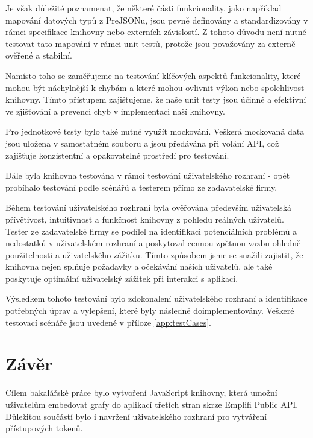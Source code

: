 \documentclass[czech, bc, kiv, he, iso690numb]{fasthesis}
\begin{document}
Je však důležité poznamenat, že některé části funkcionality, jako například mapování datových typů z PreJSONu, jsou pevně definovány a standardizovány v rámci specifikace knihovny nebo externích závislostí. 
Z tohoto důvodu není nutné testovat tato mapování v rámci unit testů, protože jsou považovány za externě ověřené a stabilní.

Namísto toho se zaměřujeme na testování klíčových aspektů funkcionality, které mohou být náchylnější k chybám a které mohou ovlivnit výkon nebo spolehlivost knihovny. 
Tímto přístupem zajišťujeme, že naše unit testy jsou účinné a efektivní ve zjišťování a prevenci chyb v implementaci naší knihovny.

Pro jednotkové testy bylo také nutné využít mockování. Veškerá mockovaná data jsou uložena v samostatném souboru a jsou předávána při volání API, 
což zajišťuje konzistentní a opakovatelné prostředí pro testování.

Dále byla knihovna testována v rámci testování uživatelského rozhraní - opět probíhalo testování podle scénářů a testerem přímo ze zadavatelské firmy.

Během testování uživatelského rozhraní byla ověřována především uživatelská přívětivost, intuitivnost a funkčnost knihovny z pohledu reálných uživatelů. 
Tester ze zadavatelské firmy se podílel na identifikaci potenciálních problémů a nedostatků v uživatelském rozhraní a poskytoval cennou zpětnou vazbu ohledně použitelnosti a uživatelského zážitku.
Tímto způsobem jsme se snažili zajistit, že knihovna nejen splňuje požadavky a očekávání našich uživatelů, ale také poskytuje optimální uživatelský zážitek při interakci s aplikací.

Výsledkem tohoto testování bylo zdokonalení uživatelského rozhraní a identifikace potřebných úprav a vylepšení, které byly následně doimplementovány. Veškeré testovací scénáře
jsou uvedené v příloze \ref{app:testCases}.



%
%
%
%
\chapter{Závěr}
Cílem bakalářské práce bylo vytvoření JavaScript knihovny, která umožní uživatelům embedovat grafy do aplikací třetích stran skrze
Emplifi Public API. Důležitou součástí bylo i navržení uživatelského rozhraní pro vytváření přístupových tokenů.
\end{document}
